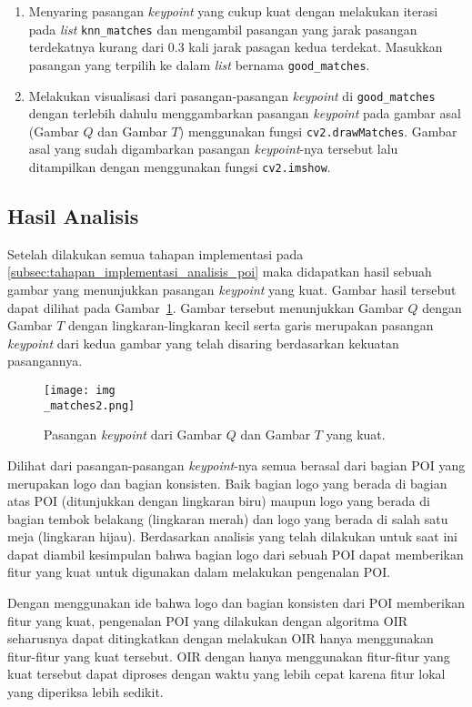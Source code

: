 \begin{enumerate}
	\item Menyaring pasangan \textit{keypoint} yang cukup kuat dengan melakukan iterasi pada \textit{list} \texttt{knn\_matches} dan mengambil pasangan yang jarak pasangan terdekatnya kurang dari $0.3$ kali jarak pasagan kedua terdekat. Masukkan pasangan yang terpilih ke dalam \textit{list} bernama \texttt{good\_matches}.
	\item Melakukan visualisasi dari pasangan-pasangan \textit{keypoint} di \texttt{good\_matches} dengan terlebih dahulu menggambarkan pasangan \textit{keypoint} pada gambar asal (Gambar $Q$ dan Gambar $T$) menggunakan fungsi \texttt{cv2.drawMatches}. Gambar asal yang sudah digambarkan pasangan \textit{keypoint}-nya tersebut lalu ditampilkan dengan menggunakan fungsi \texttt{cv2.imshow}.
\end{enumerate}

\subsection{Hasil Analisis}
Setelah dilakukan semua tahapan implementasi pada \ref{subsec:tahapan_implementasi_analisis_poi} maka didapatkan hasil sebuah gambar yang menunjukkan pasangan \textit{keypoint} yang kuat. Gambar hasil tersebut dapat dilihat pada Gambar~\ref{fig:keypoint_matches}. Gambar tersebut menunjukkan Gambar $Q$ dengan Gambar $T$ dengan lingkaran-lingkaran kecil serta garis merupakan pasangan \textit{keypoint} dari kedua gambar yang telah disaring berdasarkan kekuatan pasangannya.
\begin{figure}[H]
	\centering
	\texttt{[image: img\\\_matches2.png]}
	\caption{Pasangan \textit{keypoint} dari Gambar $Q$ dan Gambar $T$ yang kuat.}
	\label{fig:keypoint_matches}
\end{figure}

Dilihat dari pasangan-pasangan \textit{keypoint}-nya semua berasal dari bagian POI yang merupakan logo dan bagian konsisten. Baik bagian logo yang berada di bagian atas POI (ditunjukkan dengan lingkaran biru) maupun logo yang berada di bagian tembok belakang (lingkaran merah) dan logo yang berada di salah satu meja (lingkaran hijau). Berdasarkan analisis yang telah dilakukan untuk saat ini dapat diambil kesimpulan bahwa bagian logo dari sebuah POI dapat memberikan fitur yang kuat untuk digunakan dalam melakukan pengenalan POI. 

Dengan menggunakan ide bahwa logo dan bagian konsisten dari POI memberikan fitur yang kuat, pengenalan POI yang dilakukan dengan algoritma OIR seharusnya dapat ditingkatkan dengan melakukan OIR hanya menggunakan fitur-fitur yang kuat tersebut. OIR dengan hanya menggunakan fitur-fitur yang kuat tersebut dapat diproses dengan waktu yang lebih cepat karena fitur lokal yang diperiksa lebih sedikit. 

